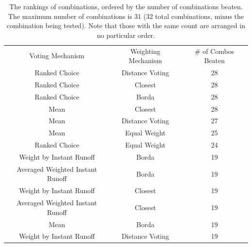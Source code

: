 \begin{table}[htbp]
    \renewcommand{\arraystretch}{1.0}

    \caption{The rankings of combinations, ordered by the number of combinations
    beaten.
    The maximum number of combinations is 31 (32 total combinations, minus
    the combination being tested).
    Note that those with the same count are arranged in no particular order.}
    \label{tab:combined-overall-rankings}

    \centering
    \begin{tabular}{|c|c|c|}
        \hline
        Voting Mechanism                 & Weighting Mechanism & \# of Combos Beaten \\
        \hhline{|=|=|=|}
        Ranked Choice                    & Distance Voting     & 28                  \\
        \hline
        Ranked Choice                    & Closest             & 28                  \\
        \hline
        Ranked Choice                    & Borda               & 28                  \\
        \hline
        Mean                             & Closest             & 28                  \\
        \hline
        Mean                             & Distance Voting     & 27                  \\
        \hline
        Mean                             & Equal Weight        & 25                  \\
        \hline
        Ranked Choice                    & Equal Weight        & 24                  \\
        \hline
        Weight by Instant Runoff         & Borda               & 19                  \\
        \hline
        Averaged Weighted Instant Runoff & Borda               & 19                  \\
        \hline
        Weight by Instant Runoff         & Closest             & 19                  \\
        \hline
        Averaged Weighted Instant Runoff & Closest             & 19                  \\
        \hline
        Mean                             & Borda               & 19                  \\
        \hline
        Weight by Instant Runoff         & Distance Voting     & 19                  \\

\end{tabular}
\end{table}
